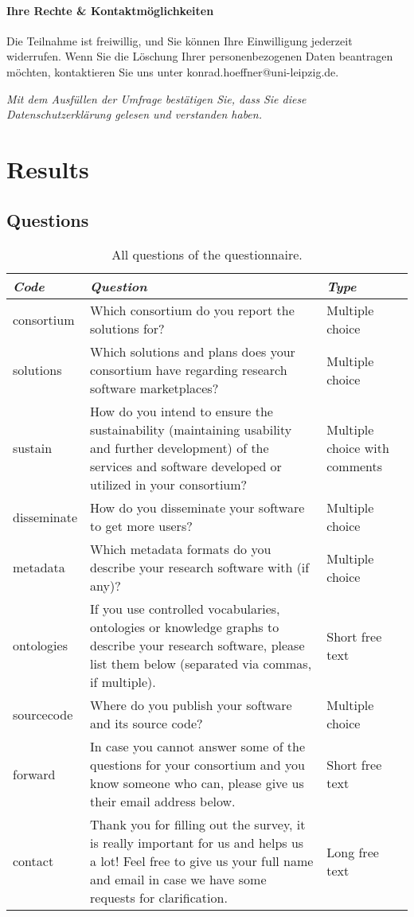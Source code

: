 \documentclass[headsepline,titlepage,twoside,12pt,toc=flat,headings=normal]{scrreprt}
\begin{document}
\subsubsection{Ihre Rechte \& Kontaktmöglichkeiten}
Die Teilnahme ist freiwillig, und Sie können Ihre Einwilligung jederzeit widerrufen.
Wenn Sie die Löschung Ihrer personenbezogenen Daten beantragen möchten, kontaktieren Sie uns unter konrad.hoeffner@uni-leipzig.de.

\emph{Mit dem Ausfüllen der Umfrage bestätigen Sie, dass Sie diese Datenschutzerklärung gelesen und verstanden haben.}

\chapter{Results}
\section{Questions}
\begin{table}[ht!]
\caption{All questions of the questionnaire.}
\label{tab:questions}
\begin{tabulary}{\textwidth}{lLL}
\toprule
\emph{Code}              &\emph{Question}   &\emph{Type}\\
\midrule
consortium        &Which consortium do you report the solutions for?    &Multiple choice\\
solutions         &Which solutions and plans does your consortium have regarding research software marketplaces?    &Multiple choice\\
sustain           &How do you intend to ensure the sustainability (maintaining usability and further development) of the services and software developed or utilized in your consortium?    &Multiple choice with comments\\
disseminate       &How do you disseminate your software to get more users?    &Multiple choice\\
metadata          &Which metadata formats do you describe your research software with (if any)?    &Multiple choice\\
ontologies        &If you use controlled vocabularies, ontologies or knowledge graphs to describe your research software, please list them below (separated via commas, if multiple).    &Short free text\\
sourcecode        &Where do you publish your software and its source code?    &Multiple choice\\
forward           &In case you cannot answer some of the questions for your consortium and you know someone who can, please give us their email address below.  &Short free text\\
contact           &Thank you for filling out the survey, it is really important for us and helps us a lot! Feel free to give us your full name and email in case we have some requests for clarification. &Long free text\\
\bottomrule
\end{tabulary}
\end{table}
\end{document}
